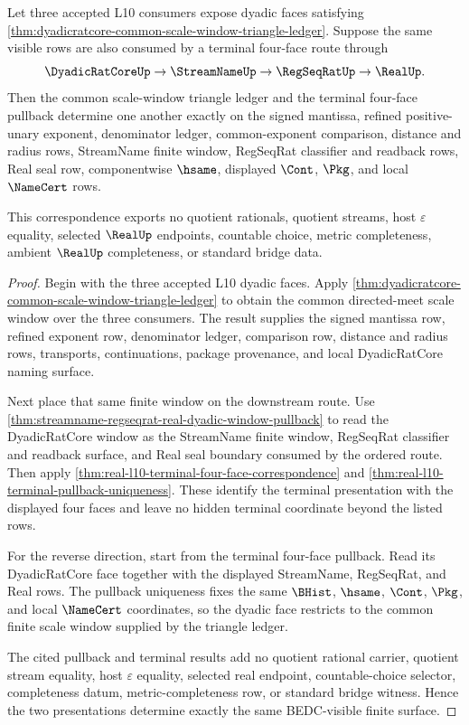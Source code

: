 \begin{theorem}
\label{thm:dyadicratcore-common-scale-window-four-face-pullback-correspondence}
Let three accepted L10 consumers expose dyadic faces satisfying \autoref{thm:dyadicratcore-common-scale-window-triangle-ledger}. Suppose the same visible rows are also consumed by a terminal four-face route through
$$
\DyadicRatCoreUp \to \StreamNameUp \to \RegSeqRatUp \to \RealUp .
$$
Then the common scale-window triangle ledger and the terminal four-face pullback determine one another exactly on the signed mantissa, refined positive-unary exponent, denominator ledger, common-exponent comparison, distance and radius rows, StreamName finite window, RegSeqRat classifier and readback rows, Real seal row, componentwise $\hsame$, displayed $\Cont$, $\Pkg$, and local $\NameCert$ rows.

This correspondence exports no quotient rationals, quotient streams, host $\varepsilon$ equality, selected $\RealUp$ endpoints, countable choice, metric completeness, ambient $\RealUp$ completeness, or standard bridge data.
\end{theorem}
\begin{proof}
Begin with the three accepted L10 dyadic faces. Apply \autoref{thm:dyadicratcore-common-scale-window-triangle-ledger} to obtain the common directed-meet scale window over the three consumers. The result supplies the signed mantissa row, refined exponent row, denominator ledger, comparison row, distance and radius rows, transports, continuations, package provenance, and local DyadicRatCore naming surface.

Next place that same finite window on the downstream route. Use \autoref{thm:streamname-regseqrat-real-dyadic-window-pullback} to read the DyadicRatCore window as the StreamName finite window, RegSeqRat classifier and readback surface, and Real seal boundary consumed by the ordered route. Then apply \autoref{thm:real-l10-terminal-four-face-correspondence} and \autoref{thm:real-l10-terminal-pullback-uniqueness}. These identify the terminal presentation with the displayed four faces and leave no hidden terminal coordinate beyond the listed rows.

For the reverse direction, start from the terminal four-face pullback. Read its DyadicRatCore face together with the displayed StreamName, RegSeqRat, and Real rows. The pullback uniqueness fixes the same $\BHist$, $\hsame$, $\Cont$, $\Pkg$, and local $\NameCert$ coordinates, so the dyadic face restricts to the common finite scale window supplied by the triangle ledger.

The cited pullback and terminal results add no quotient rational carrier, quotient stream equality, host $\varepsilon$ equality, selected real endpoint, countable-choice selector, completeness datum, metric-completeness row, or standard bridge witness. Hence the two presentations determine exactly the same BEDC-visible finite surface.
\end{proof}

